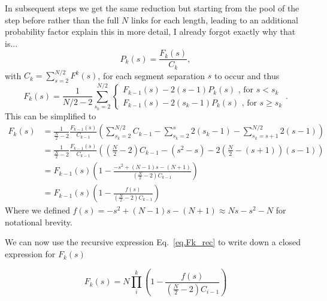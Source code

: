 \documentclass[reprint,amsmath,amssymb,rmp,onecolumn,notitlepage,11pt]{revtex4-1}
\newcommand{\red}[1]{\textcolor{red!80!black}{#1}}
\begin{document}
In subsequent steps we get the same reduction but starting from the pool of the step before rather than the full $N$ links for each length, leading to an additional probability factor \red{explain this in more detail, I already forgot exactly why that is...}
\begin{equation}
    P_k(s)=\frac{F_k(s)}{C_k},
    \label{eq.Pk}
\end{equation}
with $C_k=\sum_{s=2}^{N/2}F^k(s)$, for each segment separation $s$ to occur and thus
\begin{equation}
    F_k(s)= \frac{1}{N/2-2} \sum_{s_k=2}^{N/2} {\begin{cases}
     F_{k-1}(s)-2(s-1) P_k(s) \text{ , for } s<s_k\\
     F_{k-1}(s)-2(s_k -1)P_k(s)\text{ , for } s\geq s_k
    \end{cases}}.
\end{equation}
This can be simplified to
\begin{align}
   F_k(s)&= \frac{1}{\frac{N}{2}-2} \frac{F_{k-1}(s)}{C_{k-1}}\left( \sum_{s_k=2}^{N/2}C_{k-1} - \sum_{s_k=2}^{s} 2(s_k-1) - \sum_{s_k=s+1}^{N/2} 2(s -1) \right) \nonumber \\
   &= \frac{1}{\frac{N}{2}-2}\frac{F_{k-1}(s)}{C_{k-1}}\left(\left(\frac{N}{2}-2\right)C_{k-1} -(s^2-s)-2\left(\frac{N}{2}-(s+1)\right)(s-1)\right)  \nonumber \\
   &= F_{k-1}(s)\left(1-\frac{-s^2 +(N-1)s-(N+1)}{(\frac{N}{2}-2)C_{k-1}} \right)\nonumber \\
   &=F_{k-1}(s)\left(1-\frac{f(s)}{(\frac{N}{2}-2)C_{k-1}} \right)
   \label{eq.Fk_rec}
\end{align}
Where we defined $f(s)=-s^2 +(N-1)s-(N+1) \approx N s - s^2 - N$ for notational brevity.

We can now use the recursive expression Eq.~\ref{eq.Fk_rec} to write down a closed expression for $F_k(s)$

\begin{equation}
    F_k(s)=N\prod_{i}^k\left(1-\frac{f(s)}{(\frac{N}{2}-2)C_{i-1}} \right)
\end{equation}
\end{document}
